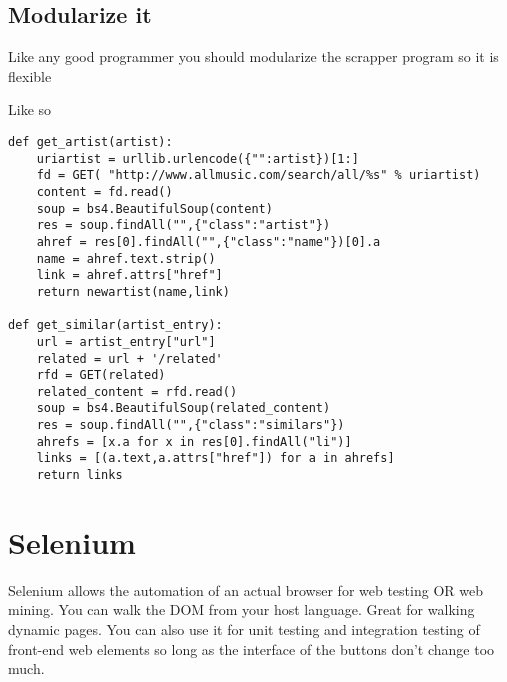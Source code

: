 \documentclass[../CMPUT-404-Notes.tex]{subfiles}
\begin{document}
\subsection{Modularize it}
Like any good programmer you should modularize the scrapper program so it is flexible

Like so
\begin{verbatim}
def get_artist(artist):
    uriartist = urllib.urlencode({"":artist})[1:]
    fd = GET( "http://www.allmusic.com/search/all/%s" % uriartist)
    content = fd.read()
    soup = bs4.BeautifulSoup(content)
    res = soup.findAll("",{"class":"artist"})
    ahref = res[0].findAll("",{"class":"name"})[0].a
    name = ahref.text.strip()
    link = ahref.attrs["href"]
    return newartist(name,link)

def get_similar(artist_entry):
    url = artist_entry["url"]
    related = url + '/related'
    rfd = GET(related)
    related_content = rfd.read()
    soup = bs4.BeautifulSoup(related_content)
    res = soup.findAll("",{"class":"similars"})
    ahrefs = [x.a for x in res[0].findAll("li")]
    links = [(a.text,a.attrs["href"]) for a in ahrefs]
    return links
\end{verbatim}

\section{Selenium}
Selenium allows the automation of an actual browser for web testing OR web mining.
You can walk the DOM from your host language.
Great for walking dynamic pages.
You can also use it for unit testing and integration testing of front-end web elements so long as the interface of the buttons don't change too much.
\end{document}
